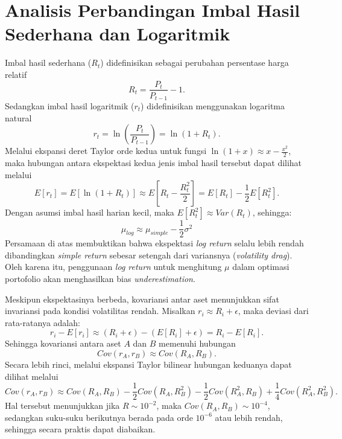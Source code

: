 \chapter{Analisis Perbandingan Imbal Hasil Sederhana dan Logaritmik}
\label{appendix:returns_comparison}

Imbal hasil sederhana ($R_t$) didefinisikan sebagai perubahan persentase harga relatif
\begin{equation}
    R_t = \frac{P_t}{P_{t-1}} - 1.
\end{equation}
Sedangkan imbal hasil logaritmik ($r_t$) didefinisikan menggunakan logaritma natural
\begin{equation}
    r_t = \ln\left(\frac{P_t}{P_{t-1}}\right) = \ln(1 + R_t).
\end{equation}
Melalui ekspansi deret Taylor orde kedua untuk fungsi $\ln(1+x) \approx x - \frac{x^2}{2}$, maka hubungan antara ekspektasi kedua jenis imbal hasil tersebut dapat dilihat melalui
\begin{equation}
    E[r_t] = E[\ln(1 + R_t)] \approx E\left[ R_t - \frac{R_t^2}{2} \right] = E[R_t] - \frac{1}{2} E[R_t^2].
\end{equation}
Dengan asumsi imbal hasil harian kecil, maka $E[R_t^2] \approx Var(R_t)$, sehingga:
\begin{equation}
    \mu_{log} \approx \mu_{simple} - \frac{1}{2} \sigma^2
\end{equation}
Persamaan di atas membuktikan bahwa ekspektasi \textit{log return} selalu lebih rendah dibandingkan \textit{simple return} sebesar setengah dari variansnya (\textit{volatility drag}). Oleh karena itu, penggunaan \textit{log return} untuk menghitung $\mu$ dalam optimasi portofolio akan menghasilkan bias \textit{underestimation}.

Meskipun ekspektasinya berbeda, kovariansi antar aset menunjukkan sifat invariansi pada kondisi volatilitas rendah. Misalkan $r_i \approx R_i + \epsilon$, maka deviasi dari rata-ratanya adalah:
\begin{equation}
    r_i - E[r_i] \approx (R_i + \epsilon) - (E[R_i] + \epsilon) = R_i - E[R_i].
\end{equation}
Sehingga kovariansi antara aset $A$ dan $B$ memenuhi hubungan
\begin{equation}
    Cov(r_A, r_B) \approx Cov(R_A, R_B).
\end{equation}
Secara lebih rinci, melalui ekspansi Taylor bilinear hubungan keduanya dapat dilihat melalui
\begin{equation}
    Cov(r_A, r_B) \approx Cov(R_A, R_B) - \frac{1}{2} Cov(R_A, R_B^2) - \frac{1}{2} Cov(R_A^2, R_B) + \frac{1}{4} Cov(R_A^2, R_B^2).
\end{equation}
Hal tersebut menunjukkan jika $R \sim 10^{-2}$, maka $Cov(R_A, R_B) \sim 10^{-4}$, sedangkan suku-suku berikutnya berada pada orde $10^{-6}$ atau lebih rendah, sehingga secara praktis dapat diabaikan.